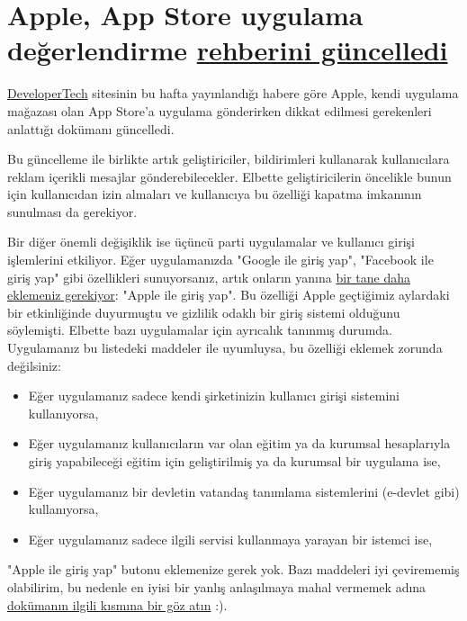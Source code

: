\documentclass[11pt]{article}
\begin{document}
\section{Apple, App Store uygulama değerlendirme \href{https://www.developer-tech.com/news/2020/mar/05/apple-ios-developers-send-ads-push-notifications/}{rehberini güncelledi}}
\label{sec:org48751f0}
\href{https://www.developer-tech.com/}{DeveloperTech} sitesinin bu hafta yayınlandığı habere göre Apple, kendi
uygulama mağazası olan App Store'a uygulama gönderirken dikkat edilmesi
gerekenleri anlattığı dokümanı güncelledi.

Bu güncelleme ile birlikte artık geliştiriciler, bildirimleri kullanarak
kullanıcılara reklam içerikli mesajlar gönderebilecekler. Elbette
geliştiricilerin öncelikle bunun için kullanıcıdan izin almaları ve
kullanıcıya bu özelliği kapatma imkanının sunulması da gerekiyor.

Bir diğer önemli değişiklik ise üçüncü parti uygulamalar ve kullanıcı girişi
işlemlerini etkiliyor. Eğer uygulamanızda "Google ile giriş yap", "Facebook
ile giriş yap" gibi özellikleri sunuyorsanız, artık onların yanına \href{https://developer.apple.com/app-store/review/guidelines/\#sign-in-with-apple}{bir tane
daha eklemeniz gerekiyor}: "Apple ile giriş yap". Bu özelliği Apple geçtiğimiz
aylardaki bir etkinliğinde duyurmuştu ve gizlilik odaklı bir giriş sistemi
olduğunu söylemişti. Elbette bazı uygulamalar için ayrıcalık tanınmış durumda.
Uygulamanız bu listedeki maddeler ile uyumluysa, bu özelliği eklemek zorunda
değilsiniz:

\begin{itemize}
\item Eğer uygulamanız sadece kendi şirketinizin kullanıcı girişi sistemini kullanıyorsa,
\item Eğer uygulamanız kullanıcıların var olan eğitim ya da kurumsal hesaplarıyla
giriş yapabileceği eğitim için geliştirilmiş ya da kurumsal bir uygulama
ise,
\item Eğer uygulamanız bir devletin vatandaş tanımlama sistemlerini (e-devlet
gibi) kullanıyorsa,
\item Eğer uygulamanız sadece ilgili servisi kullanmaya yarayan bir istemci ise,
\end{itemize}

"Apple ile giriş yap" butonu eklemenize gerek yok. Bazı maddeleri iyi
çevirememiş olabilirim, bu nedenle en iyisi bir yanlış anlaşılmaya mahal
vermemek adına \href{https://developer.apple.com/app-store/review/guidelines/\#sign-in-with-apple}{dokümanın ilgili kısmına bir göz atın} :).
\end{document}
